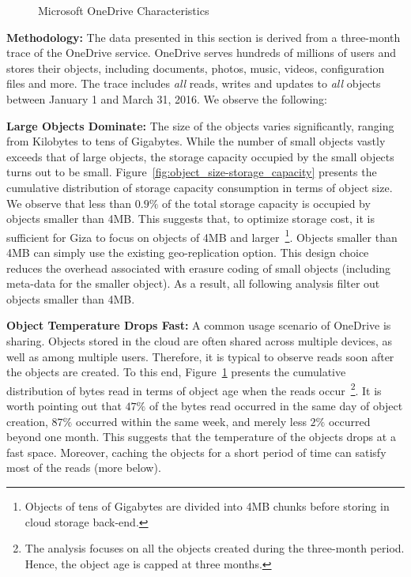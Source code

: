 \begin{figure}[tp]
\begin{subfigure}{.3\textwidth}
  \caption{}
  \label{fig:write_read_gap-bytes_read}
\end{subfigure}%
\caption{Microsoft OneDrive Characteristics}
\label{fig:case_for_giza}
\end{figure}

{\bf Methodology:} The data presented in this section is derived from a three-month trace of the OneDrive service. OneDrive serves hundreds of millions of users and stores their objects, including documents, photos, music, videos, configuration files and more. The trace includes {\em all} reads, writes and updates to {\em all} objects between January 1 and March 31, 2016. We observe the following:

{\bf Large Objects Dominate:} The size of the objects varies significantly, ranging from Kilobytes to tens of Gigabytes. While the number of small objects vastly exceeds that of large objects, the storage capacity occupied by the small objects turns out to be small. Figure~\ref{fig:object_size-storage_capacity} presents the cumulative distribution of storage capacity consumption in terms of object size. We observe that less than $0.9\%$ of the total storage capacity is occupied by objects smaller than 4MB. This suggests that, to optimize storage cost, it is sufficient for Giza to focus on objects of 4MB and larger~\footnote{Objects of tens of Gigabytes are divided into 4MB chunks before storing in cloud storage back-end.}. Objects smaller than 4MB can simply use the existing geo-replication option. This design choice reduces the overhead associated with erasure coding of small objects (including meta-data for the smaller object). As a result, all following analysis filter out objects smaller than 4MB.

{\bf Object Temperature Drops Fast:} A common usage scenario of OneDrive is sharing. Objects stored in the cloud are often shared across multiple devices, as well as among multiple users. Therefore, it is typical to observe reads soon after the objects are created. To this end, Figure~\ref{fig:write_read_gap-bytes_read} presents the cumulative distribution of bytes read in terms of object age when the reads occur~\footnote{The analysis focuses on all the objects created during the three-month period. Hence, the object age is capped at three months.}. It is worth pointing out that $47\%$ of the bytes read occurred in the same day of object creation, $87\%$ occurred within the same week, and merely less $2\%$ occurred beyond one month. This suggests that the temperature of the objects drops at a fast space. Moreover, caching the objects for a short period of time can satisfy most of the reads (more below).

